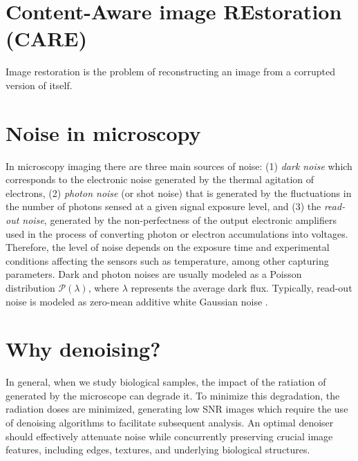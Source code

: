 \section{Content-Aware image REstoration (CARE)}

Image restoration is the problem of reconstructing an image from a corrupted version of itself. %

\section{Noise in microscopy}

In microscopy imaging there are three main sources of noise: (1)
\emph{dark noise} which corresponds to the electronic noise generated
by the thermal agitation of electrons, (2) \emph{photon noise} (or
shot noise) that is generated by the fluctuations in the number of
photons sensed at a given signal exposure level, and (3) the
\emph{read-out noise}, generated by the non-perfectness of the output
electronic amplifiers used in the process of converting photon or
electron accumulations into voltages. Therefore, the level of noise
depends on the exposure time and experimental conditions affecting the
sensors such as temperature, among other capturing parameters. Dark
and photon noises are usually modeled as a Poisson distribution
$\mathcal{P}(\lambda)$, where $\lambda$ represents the average dark
flux. Typically, read-out noise is modeled as zero-mean additive white Gaussian
noise \cite{meiniel2018denoising,zhou2020wirtinger}.


\section{Why denoising?}
\label{sec:why_denoising}


In general, when we study biological samples, the impact of the
ratiation of generated by the microscope can degrade it. To minimize
this degradation, the radiation doses are minimized, generating low
\gls{SNR} images which require the use of denoising algorithms to
facilitate subsequent analysis. An optimal denoiser should
effectively attenuate noise while concurrently preserving crucial
image features, including edges, textures, and underlying biological
structures.

